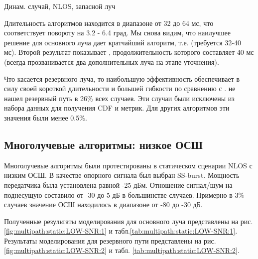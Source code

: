\begin{table}[H]
  \begin{center}
    \caption{Динам. случай, NLOS, запасной луч}
    \label{tab:multipath:rotation:NLOS:2}
  \end{center}
\end{table}


Длительность алгоритмов находится в диапазоне от 32 до 64 мс, что соответствует повороту на 3.2 - 6.4 град.
Мы снова видим, что наилучшее решение для основного луча дает кратчайший алгоритм, т.е.
\AuxBeam{} (требуется 32-40 мс). Второй результат показывает \hSearchMMSE{}, продолжительность которого составляет
40 мс (всегда прозванивается два дополнительных луча на этапе уточнения). 

Что касается резервного луча, то наибольшую эффективность обеспечивает \hSearchMMSE{} в силу своей короткой длительности 
и большей гибкости по сравнению с \AuxBeam{}.
\ACS{} не нашел резервный путь в 26\% всех случаев. Эти случаи
были исключены из набора данных для получения CDF и метрик. Для других алгоритмов эти значения были
менее 0.5\%.

\subsection{Многолучевые алгоритмы: низкое ОСШ}
Многолучевые алгоритмы были протестированы в статическом сценарии NLOS с низким
ОСШ. В качестве опорного сигнала был выбран SS-burst. 
Мощность передатчика была установлена равной -25
дБм. Отношение сигнал/шум на поднесущую составило от -30 до 5 дБ в
большинстве случаев. Примерно в 3\% случаев значение ОСШ находилось в
диапазоне от -80 до -30 дБ.

Полученные результаты моделирования для основного луча представлены на
рис.\ref{fig:multipath:static:LOW-SNR:1} и 
табл.\ref{tab:multipath:static:LOW-SNR:1}. Результаты моделирования для
резервного пути представлены на рис. \ref{fig:multipath:static:LOW-SNR:2} и табл.
\ref{tab:multipath:static:LOW-SNR:2}.

